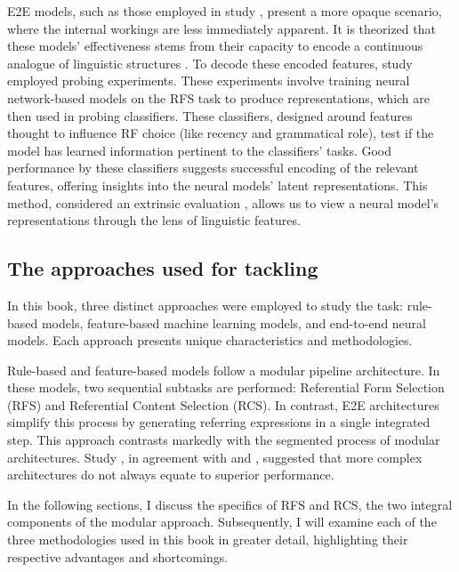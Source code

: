 E2E models, such as those employed in study \studF, present a more opaque scenario, where the internal workings are less immediately apparent. It is theorized that these models' effectiveness stems from their capacity to encode a continuous analogue of linguistic structures  \citep{torroba-hennigen-etal-2020-intrinsic}. To decode these encoded features, study \studG employed probing experiments. These experiments involve training neural network-based models on the RFS task to produce representations, which are then used in probing classifiers. These classifiers, designed around features thought to influence RF choice (like recency and grammatical role), test if the model has learned information pertinent to the classifiers' tasks. Good performance by these classifiers suggests successful encoding of the relevant features, offering insights into the neural models' latent representations. This method, considered an extrinsic evaluation \citep{torroba-hennigen-etal-2020-intrinsic}, allows us to view a neural model’s representations through the lens of linguistic features.


\subsection{The approaches used for tackling \context}\label{chap8_subsec:method}

In this book, three distinct approaches were employed to study the \context task: rule-based models, feature-based machine learning models, and end-to-end neural models. Each approach presents unique characteristics and methodologies.

Rule-based and feature-based models follow a modular pipeline architecture. In these models, two sequential subtasks are performed: Referential Form Selection (RFS) and Referential Content Selection (RCS). In contrast, E2E architectures simplify this process by generating referring expressions in a single integrated step. This approach contrasts markedly with the segmented process of modular architectures. Study \studF, in agreement with \citet{Rudin2019} and \citet{castro-ferreira-etal-2019-neural}, suggested that more complex architectures do not always equate to superior performance.

In the following sections, I discuss the specifics of RFS and RCS, the two integral components of the modular approach. Subsequently, I will examine each of the three methodologies used in this book in greater detail, highlighting their respective advantages and shortcomings.

